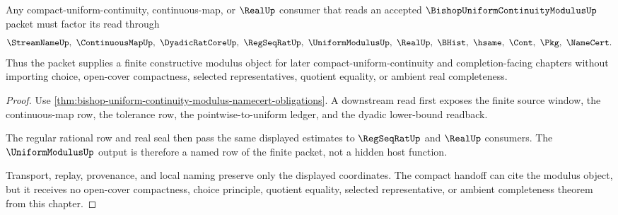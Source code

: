\begin{theorem}
\label{thm:bishop-uniform-continuity-modulus-compact-handoff}
Any compact-uniform-continuity, continuous-map, or $\RealUp$ consumer that reads an accepted $\BishopUniformContinuityModulusUp$ packet must factor its read through
$$
\StreamNameUp,\ \ContinuousMapUp,\ \DyadicRatCoreUp,\ \RegSeqRatUp,\ \UniformModulusUp,\ \RealUp,\ \BHist,\ \hsame,\ \Cont,\ \Pkg,\ \NameCert .
$$
Thus the packet supplies a finite constructive modulus object for later compact-uniform-continuity and completion-facing chapters without importing choice, open-cover compactness, selected representatives, quotient equality, or ambient real completeness.
\end{theorem}
\begin{proof}
Use \autoref{thm:bishop-uniform-continuity-modulus-namecert-obligations}. A downstream read first exposes the finite source window, the continuous-map row, the tolerance row, the pointwise-to-uniform ledger, and the dyadic lower-bound readback.

The regular rational row and real seal then pass the same displayed estimates to $\RegSeqRatUp$ and $\RealUp$ consumers. The $\UniformModulusUp$ output is therefore a named row of the finite packet, not a hidden host function.

Transport, replay, provenance, and local naming preserve only the displayed coordinates. The compact handoff can cite the modulus object, but it receives no open-cover compactness, choice principle, quotient equality, selected representative, or ambient completeness theorem from this chapter.
\end{proof}


\begin{closurestatus}{\BishopUniformContinuityModulusUp}
  \theoryclosure{\seedClosure}
  \formalstatus{\unformalizedV}
\end{closurestatus}
